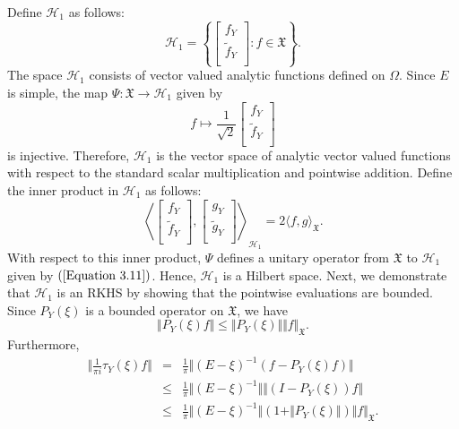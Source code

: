 \documentclass [12pt,reqno]{amsart}
\numberwithin{equation}{subsection}
\numberwithin{equation}{section}
\begin{document}
Define \(\mathcal{H}_1\) as follows:
\[
\mathcal{H}_1 = \left\lbrace \begin{bmatrix} 
	f_Y  \\
	\tilde{f}_Y \\
	\end{bmatrix} : f \in \mathfrak{X} \right\rbrace.
\]
The space \(\mathcal{H}_1\) consists of vector valued analytic functions defined on \(\Omega\). Since \(E\) is simple, the map \(\Psi: \mathfrak{X} \rightarrow \mathcal{H}_1\) given by
\begin{equation} \label{Equation 3.11}
f \mapsto \frac{1}{\sqrt{2}} \begin{bmatrix} 
	f_Y  \\
	\tilde{f}_Y \\
	\end{bmatrix}
\end{equation}
is injective. Therefore, \(\mathcal{H}_1\) is the vector space of analytic vector valued functions with respect to the standard scalar multiplication and pointwise addition.	
	 Define the inner product in $\mathcal{H}_1$ as follows:
\begin{equation}
\left\langle \begin{bmatrix} 
	f_Y  \\
	\tilde{f}_Y \\
\end{bmatrix}, \begin{bmatrix} 
	g_Y  \\
	\tilde{g}_Y \\
\end{bmatrix} \right\rangle_{\mathcal{H}_1} = 2 \langle f, g \rangle_\mathfrak{X}.
\end{equation}
With respect to this inner product, $\Psi$ defines a unitary operator from $\mathfrak{X}$ to $\mathcal{H}_1$ given by $(\ref{Equation 3.11})$. Hence, $\mathcal{H}_1$ is a Hilbert space. Next, we demonstrate that $\mathcal{H}_1$ is an RKHS by showing that the pointwise evaluations are bounded. Since $P_Y(\xi)$ is a bounded operator on $\mathfrak{X}$, we have
\begin{equation} \label{Equation 3.13}
\Vert P_Y(\xi)f \Vert \leq \Vert P_Y(\xi) \Vert \Vert f \Vert_\mathfrak{X}.
\end{equation}
Furthermore, \begin{eqnarray}
\Vert \frac{1}{\pi i} \tau_Y(\xi)f\Vert &=& \frac{1}{\pi} \Vert (E-\xi)^{-1}(f-P_Y(\xi)f) \Vert\\  
                  & \leq & \frac{1}{\pi} \Vert (E-\xi)^{-1}\Vert \Vert \left(I-  P_Y(\xi)\right)f \Vert  \\ \label{Equation 3.16}
&\leq & \frac{1}{\pi} \Vert (E-\xi)^{-1}\Vert \left( 1+ \Vert P_Y(\xi) \Vert \right) \Vert f \Vert_\mathfrak{X}.
\end{eqnarray}
\end{document}
